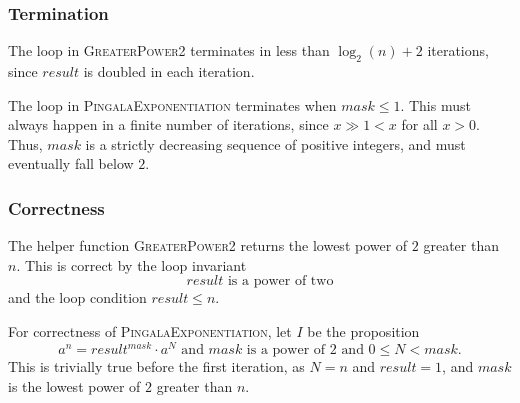 \documentclass[12pt]{article}
\begin{document}
\subsubsection*{Termination} \label{sec:termination}
The loop in \textsc{GreaterPower2} terminates in less than $\log_{2}(n) + 2$
iterations, since $result$ is doubled in each iteration.

The loop in \textsc{PingalaExponentiation} terminates when $mask \leq 1$.
This must always happen in a finite number of iterations,
since $x \gg 1 < x$ for all $x > 0$.
Thus, $mask$ is a strictly decreasing sequence of positive integers,
and must eventually fall below $2$.

\subsubsection*{Correctness} \label{sec:correctness}
The helper function \textsc{GreaterPower2} returns the lowest power of $2$
greater than $n$.
This is correct by the loop invariant \[
    result \text{ is a power of two}
\] and the loop condition $result \leq n$.

For correctness of \textsc{PingalaExponentiation},
let $I$ be the proposition \[
    a^{n} = result^{mask} \cdot a^{N} \text{ and } mask \text{ is a power of } 2
        \text{ and } 0 \leq N < mask.
\] This is trivially true before the first iteration, as $N = n$ and $result = 1$,
and $mask$ is the lowest power of $2$ greater than $n$.
\end{document}

